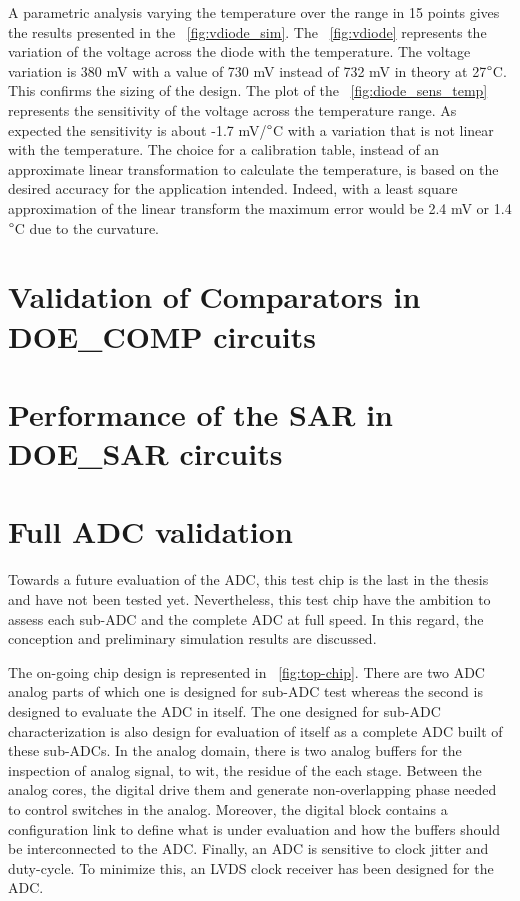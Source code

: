 A parametric analysis varying the temperature over the range in 15 points gives the results presented in the \figurename~\ref{fig:vdiode_sim}. The \figurename~\ref{fig:vdiode} represents the variation of the voltage across the diode with the temperature. The voltage variation is 380 mV with a value of 730 mV instead of 732 mV in theory at 27\(\degree\)C. This confirms the sizing of the design. The plot of the \figurename~\ref{fig:diode_sens_temp} represents the sensitivity of the voltage across the temperature range. As expected the sensitivity is about -1.7 mV/\(\degree\)C with a variation that is not linear with the temperature. The choice for a calibration table, instead of an approximate linear transformation to calculate the temperature, is based on the desired accuracy for the application intended. Indeed, with a least square approximation of the linear transform the maximum error would be 2.4 mV or 1.4\(\degree\)C due to the curvature.

\clearpage
\section{Validation of Comparators in DOE\_COMP circuits}


\section{Performance of the SAR in DOE\_SAR circuits}


\section{Full ADC validation}
Towards a future evaluation of the ADC, this test chip is the last in the thesis and have not been tested yet. Nevertheless, this test chip have the ambition to assess each sub-ADC and the complete ADC at full speed. In this regard, the conception and preliminary simulation results are discussed.

The on-going chip design is represented in \figurename~\ref{fig:top-chip}. There are two ADC analog parts of which one is designed for sub-ADC test whereas the second is designed to evaluate the ADC in itself. The one designed for sub-ADC characterization is also design for evaluation of itself as a complete ADC built of these sub-ADCs. In the analog domain, there is two analog buffers for the inspection of analog signal, to wit, the residue of the each stage. Between the analog cores, the digital drive them and generate non-overlapping phase needed to control switches in the analog. Moreover, the digital block contains a configuration link to define what is under evaluation and how the buffers should be interconnected to the ADC\@. Finally, an ADC is sensitive to clock jitter and duty-cycle. To minimize this, an LVDS clock receiver has been designed for the ADC\@.

